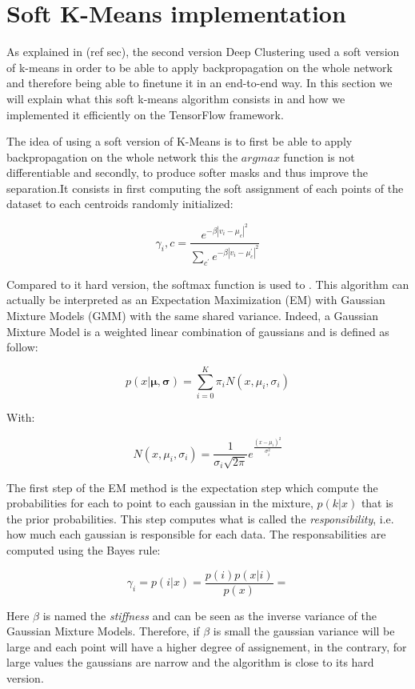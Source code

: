 \documentclass[master,final,11pt]{iscs-thesis}
\begin{document}
\section{Soft K-Means implementation}

As explained in (ref sec), the second version Deep Clustering used a soft version of k-means in order to be able to apply backpropagation on the whole network and therefore being able to finetune it in an end-to-end way. In this section we will explain what this soft k-means algorithm consists in and how we implemented it efficiently on the TensorFlow framework.

The idea of using a soft version of K-Means is to first be able to apply backpropagation on the whole network this the $argmax$ function is not differentiable and secondly, to produce softer masks and thus improve the separation.It consists in first computing the soft assignment of each points of the dataset to each centroids randomly initialized:

\[ \gamma_i,c = \frac{e^{-\beta |v_i-\mu_c|^2}}{\sum_{c^\prime} e^{-\beta |v_i-\mu_c^\prime|^2}}  \]

Compared to it hard version, the softmax function is used to . This algorithm can actually be interpreted as an Expectation Maximization (EM) with Gaussian Mixture Models (GMM) with the same shared variance. Indeed, a Gaussian Mixture Model is a weighted linear combination of gaussians and is defined as follow:

\[
 p(x | \mathbf{\mu}, \mathbf{\sigma}) = \sum_{i=0}^K \pi_i N(x, \mu_i,\sigma_i)
\]

With:

\[
N(x, \mu_i,\sigma_i) = \frac{1}{\sigma_i \sqrt{2\pi}} e^{\frac{(x-\mu_i)^2}{\sigma_i^2}}
\]

The first step of the EM method is the expectation step which compute the probabilities for each to point to each gaussian in the mixture, $p(k|x)$ that is the prior probabilities. This step computes what is called the \textit{responsibility}, i.e. how much each gaussian is responsible for each data. The responsabilities are computed using the Bayes rule:

\[
\gamma_i = p(i|x) = \frac{p(i)p(x|i)}{p(x)} = 
\]




Here $\beta$ is named the \textit{stiffness} and can be seen as the inverse variance of the Gaussian Mixture Models. Therefore, if $\beta$ is small the gaussian variance will be large and each point will have a higher degree of assignement, in the contrary, for large values the gaussians are narrow and the algorithm is close to its hard version.
\end{document}
